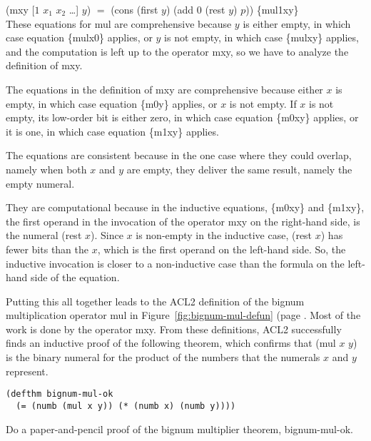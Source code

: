 \hspace*{2cm} \textsf{(mxy [$1$ $x_1$ $x_2$ \dots] $y$)} $=$ \textsf{(cons (first $y$) (add 0 (rest $y$) $p$))} \hfill \{mul1xy\}
\\

These equations for \textsf{mul} are comprehensive because $y$ is either empty,
in which case equation \{mulx0\} applies,
or $y$ is not empty, in which case \{mulxy\} applies, and
the computation is left up to the operator \textsf{mxy},
so we have to analyze the definition of \textsf{mxy}.

The equations in the definition of \textsf{mxy} are comprehensive
because either $x$ is empty, in which case
equation \{m0y\} applies, or $x$ is not empty.
If $x$ is not empty, its low-order bit is either zero,
in which case equation \{m0xy\} applies, or it is one,
in which case equation \{m1xy\} applies.

The equations are consistent because in the one case
where they could overlap, namely when both $x$ and $y$
are empty, they deliver the same result, namely the empty numeral.

They are computational because in the inductive equations,
\{m0xy\} and \{m1xy\}, the first operand in
the invocation of the operator \textsf{mxy} on the right-hand side,
is the numeral \textsf{(rest $x$)}.
Since $x$ is non-empty in the inductive case,
\textsf{(rest $x$)} has fewer bits than the $x$, which is the first operand
on the left-hand side.
So, the inductive invocation is closer to a non-inductive
case than the formula on the left-hand side of the equation.

Putting this all together leads to the ACL2 definition
of the bignum multiplication operator \textsf{mul} in
Figure~\ref{fig:bignum-mul-defun} (page \pageref{fig:bignum-mul-defun}.
Most of the work is done by the operator \textsf{mxy}.
From these definitions, ACL2 successfully finds an
inductive proof of the following theorem,
which confirms that \textsf{(mul $x$ $y$)} is the binary numeral
for the product of the numbers that the numerals $x$ and $y$ represent.

\label{bignum-mul-thm}
\begin{Verbatim}
(defthm bignum-mul-ok
  (= (numb (mul x y)) (* (numb x) (numb y))))
\end{Verbatim}

\begin{ExerciseList}
\Exercise
Do a paper-and-pencil proof of
the bignum multiplier theorem, \textsf{bignum-mul-ok}.
\end{ExerciseList}


